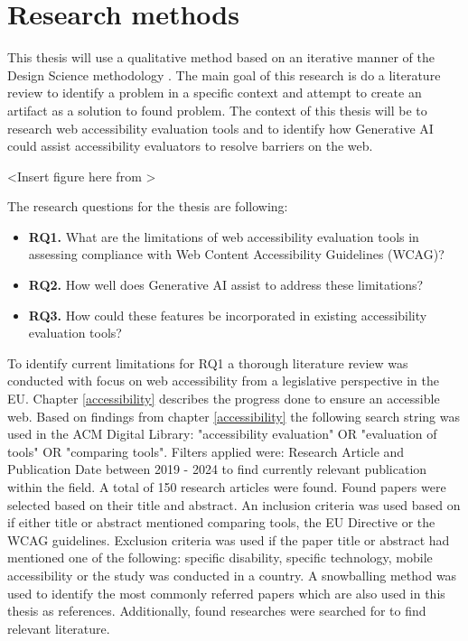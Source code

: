\chapter{Research methods\label{methods}}

This thesis will use a qualitative method based on an iterative manner of the Design Science methodology \citep{designsciencemethodology, iterativedesignscience}. The main goal of this research is do a literature review to identify a problem in a specific context and attempt to create an artifact as a solution to found problem. The context of this thesis will be to research web accessibility evaluation tools and to identify how Generative AI could assist accessibility evaluators to resolve barriers on the web. 

<Insert figure here from \cite{iterativedesignscience}>

The research questions for the thesis are following:

\begin{itemize}
    \item \textbf{RQ1.} What are the limitations of web accessibility evaluation tools in assessing compliance with Web Content Accessibility Guidelines (WCAG)?
    \item \textbf{RQ2.} How well does Generative AI assist to address these limitations?
    \item \textbf{RQ3.} How could these features be incorporated in existing accessibility evaluation tools?
\end{itemize}

To identify current limitations for RQ1 a thorough literature review was conducted with focus on web accessibility from a legislative perspective in the EU.  Chapter \ref{accessibility} describes the progress done to ensure an accessible web. Based on findings from chapter \ref{accessibility} the following search string was used in the ACM Digital Library: "accessibility evaluation" OR "evaluation of tools" OR "comparing tools". Filters applied were: Research Article and Publication Date between 2019 - 2024 to find currently relevant publication within the field. A total of 150 research articles were found. Found papers were selected based on their title and abstract. An inclusion criteria was used based on if either title or abstract mentioned comparing tools, the EU Directive or the WCAG guidelines. Exclusion criteria was used if the paper title or abstract had mentioned one of the following: specific disability, specific technology, mobile accessibility or the study was conducted in a country. A snowballing method was used to identify the most commonly referred papers which are also used in this thesis as references. Additionally, found researches were searched for to find relevant literature.






